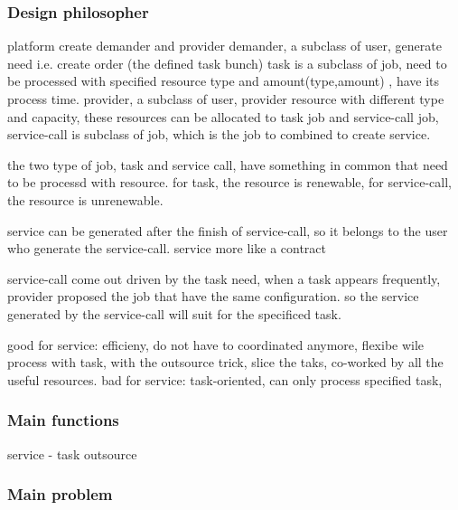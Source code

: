 \subsubsection{Design philosopher} %
\label{ssub:design_philosopher}
platform create demander and provider
demander, a subclass of user, generate need i.e. create order (the defined task bunch)
    task is a subclass of job, need to be processed with specified resource type and amount(type,amount) , have its process time.
provider, a subclass of user, provider resource with different type and capacity, these resources can be allocated to task job and service-call job, service-call is subclass of job, which is the job to combined to create service.

the two type of job, task and service call, have something in common that need to be processd with resource. for task, the resource is renewable, for service-call, the resource is unrenewable.

service can be generated after the finish of service-call, so it belongs to the user who generate the service-call. service more like a contract

service-call come out driven by the task need, when a task appears frequently, provider proposed the job that have the same configuration. so the service generated by the service-call will suit for the specificed task.

good for service: efficieny, do not have to coordinated anymore, flexibe wile process with task, with the outsource trick, slice the taks, co-worked by all the useful resources.
bad for service: task-oriented, can only process specified task,


\subsubsection{Main functions} %
\label{ssub:main_functions}
service - task outsource

\subsubsection{Main problem} %
\label{ssub:main_problem}


